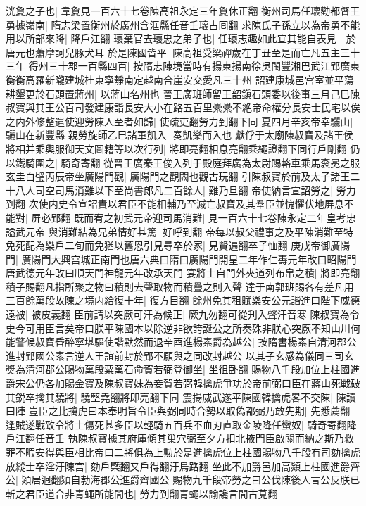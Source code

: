 洸夐之子也|{
	韋夐見一百六十七卷陳高祖永定三年夐休正翻}
衡州司馬任瓌勸都督王勇據嶺南|{
	隋志梁置衡州於廣州含洭縣任音壬瓌占囘翻}
求陳氏子孫立以為帝勇不能用以所部來降|{
	降戶江翻}
瓌棄官去瓌忠之弟子也|{
	任瓌志趣如此宜其能自表見　於唐元也蕭摩訶兒豚犬耳}
於是陳國皆平|{
	陳高祖受梁禪歲在丁丑至是而亡凡五主三十三年}
得州三十郡一百縣四百|{
	按隋志陳境當時有揚東揚南徐吳閩豐湘巴武江郢廣東衡衡高羅新隴建城桂東寧靜南定越南合崖安交愛凡三十州}
詔建康城邑宫室並平蕩耕墾更於石頭置蔣州|{
	以蔣山名州也}
晉王廣班師留王韶鎭石頭委以後事三月己巳陳叔寶與其王公百司發建康詣長安大小在路五百里纍纍不絶帝命權分長安士民宅以俟之内外修整遣使迎勞陳人至者如歸|{
	使疏吏翻勞力到翻下同}
夏四月辛亥帝幸驪山|{
	驪山在新豐縣}
親勞旋師乙巳諸軍凱入|{
	奏凱樂而入也}
獻俘于太廟陳叔寶及諸王侯將相并乘輿服御天文圖籍等以次行列|{
	將即亮翻相息亮翻乘繩證翻下同行戶剛翻}
仍以鐵騎圍之|{
	騎奇寄翻}
從晉王廣秦王俊入列于殿庭拜廣為太尉賜輅車乘馬衮冕之服玄圭白璧丙辰帝坐廣陽門觀|{
	廣陽門之觀闕也觀古玩翻}
引陳叔寶於前及太子諸王二十八人司空司馬消難以下至尚書郎凡二百餘人|{
	難乃旦翻}
帝使納言宣詔勞之|{
	勞力到翻}
次使内史令宣詔責以君臣不能相輔乃至滅亡叔寶及其羣臣並愧懼伏地屏息不能對|{
	屏必郢翻}
既而宥之初武元帝迎司馬消難|{
	見一百六十七卷陳永定二年皇考忠謚武元帝}
與消難結為兄弟情好甚篤|{
	好呼到翻}
帝每以叔父禮事之及平陳消難至特免死配為樂戶二旬而免猶以舊恩引見尋卒於家|{
	見賢遍翻卒子恤翻}
庚戌帝御廣陽門|{
	廣陽門大興宫城正南門也唐六典曰隋曰廣陽門開皇二年作仁夀元年改曰昭陽門唐武德元年改曰順天門神龍元年改承天門}
宴將士自門外夾道列布帛之積|{
	將即亮翻積子賜翻凡指所聚之物曰積則去聲取物而積疊之則入聲}
達于南郭班賜各有差凡用三百餘萬段故陳之境内給復十年|{
	復方目翻}
餘州免其租賦樂安公元諧進曰陛下威德遠被|{
	被皮義翻}
臣前請以突厥可汗為候正|{
	厥九勿翻可從刋入聲汗音寒}
陳叔寶為令史今可用臣言矣帝曰朕平陳國本以除逆非欲誇誕公之所奏殊非朕心突厥不知山川何能警候叔寶昏醉寧堪驅使諧默然而退辛酉進楊素爵為越公|{
	按隋書楊素自清河郡公進封郢國公素言逆人王誼前封於郢不願與之同改封越公}
以其子玄感為儀同三司玄奬為清河郡公賜物萬段粟萬石命賀若弼登御坐|{
	坐徂卧翻}
賜物八千段加位上柱國進爵宋公仍各加賜金寶及陳叔寶妹為妾賀若弼韓擒虎爭功於帝前弼曰臣在蔣山死戰破其鋭卒擒其驍將|{
	驍堅堯翻將即亮翻下同}
震揚威武遂平陳國韓擒虎畧不交陳|{
	陳讀曰陣}
豈臣之比擒虎曰本奉明旨令臣與弼同時合勢以取偽都弼乃敢先期|{
	先悉薦翻}
逢賊遂戰致令將士傷死甚多臣以輕騎五百兵不血刃直取金陵降任蠻奴|{
	騎奇寄翻降戶江翻任音壬}
執陳叔寶據其府庫傾其巢穴弼至夕方扣北掖門臣啟關而納之斯乃救罪不暇安得與臣相比帝曰二將俱為上勲於是進擒虎位上柱國賜物八千段有司劾擒虎放縱士卒淫汙陳宫|{
	劾戶槩翻又戶得翻汙烏路翻}
坐此不加爵邑加高熲上柱國進爵齊公|{
	熲居迥翻熲自勃海郡公進爵齊國公}
賜物九千段帝勞之曰公伐陳後人言公反朕已斬之君臣道合非青蠅所能間也|{
	勞力到翻青蠅以諭讒言間古莧翻}
